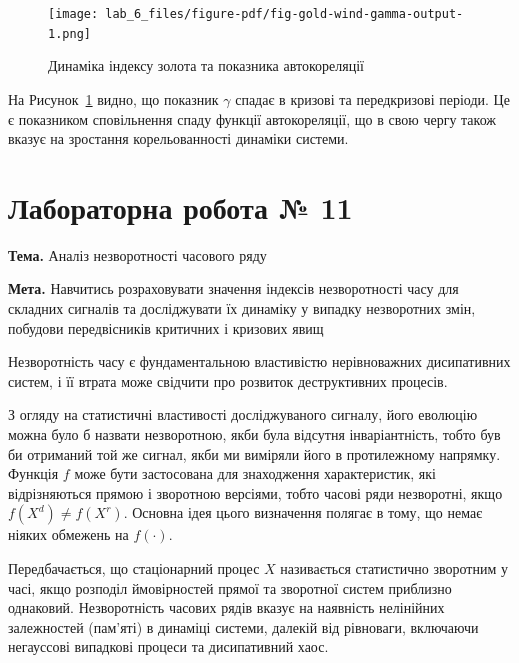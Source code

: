 \documentclass[
  letterpaper,
]{report}
\begin{document}
\begin{figure}[H]

{\centering \texttt{[image: lab\_6\_files/figure-pdf/fig-gold-wind-gamma-output-1.png]}

}

\caption{\label{fig-gold-wind-gamma}Динаміка індексу золота та показника
автокореляції}

\end{figure}

На Рисунок~\ref{fig-gold-wind-gamma} видно, що показник \(\gamma\)
спадає в кризові та передкризові періоди. Це є показником сповільнення
спаду функції автокореляції, що в свою чергу також вказує на зростання
корельованності динаміки системи.


\hypertarget{ux43bux430ux431ux43eux440ux430ux442ux43eux440ux43dux430-ux440ux43eux431ux43eux442ux430-11}{%
\chapter{Лабораторна робота №
11}\label{ux43bux430ux431ux43eux440ux430ux442ux43eux440ux43dux430-ux440ux43eux431ux43eux442ux430-11}}

\textbf{Тема.} Аналіз незворотності часового ряду

\textbf{Мета.} Навчитись розраховувати значення індексів незворотності
часу для складних сигналів та досліджувати їх динаміку у випадку
незворотних змін, побудови передвісників критичних і кризових явищ

Незворотність часу є фундаментальною властивістю нерівноважних
дисипативних систем, і її втрата може свідчити про розвиток
деструктивних процесів.

З огляду на статистичні властивості досліджуваного сигналу, його
еволюцію можна було б назвати незворотною, якби була відсутня
інваріантність, тобто був би отриманий той же сигнал, якби ми виміряли
його в протилежному напрямку. Функція \(f\) може бути застосована для
знаходження характеристик, які відрізняються прямою і зворотною
версіями, тобто часові ряди незворотні, якщо \(f(X^d) \neq f(X^r)\).
Основна ідея цього визначення полягає в тому, що немає ніяких обмежень
на \(f(\cdot )\).

Передбачається, що стаціонарний процес \(X\) називається статистично
зворотним у часі, якщо розподіл ймовірностей прямої та зворотної систем
приблизно однаковий. Незворотність часових рядів вказує на наявність
нелінійних залежностей (пам'яті) в динаміці системи, далекій від
рівноваги, включаючи негауссові випадкові процеси та дисипативний хаос.
\end{document}
